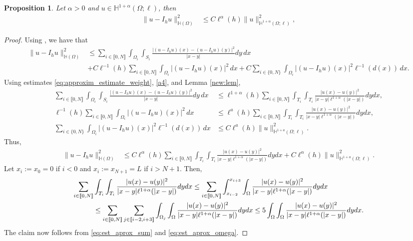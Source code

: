 \documentclass[11 pt]{article}
\newcommand\inter[1]{\llbracket #1\rrbracket}
\newtheorem{proposition}[theorem]{Proposition}
\numberwithin{equation}{section}
\newcommand{\weH}[1]{\mathbb H^{#1}(\Omega;\ell)}
\begin{document}
\begin{proposition}\label{prop:est_interpolator}
Let $\alpha>0$ and $u\in\weH{1+\alpha}$, then
\begin{align}\label{eq:interp_final}
    \|u-I_hu\|^2_{\mathbb H(\Omega)}&\leq C\ell^{\alpha}(h) \|u\|^2_{\mathbb H^{1+\alpha}(\Omega;\ell)},
\end{align}
\end{proposition}
\begin{proof}
Using , we have that
\begin{align*}
    \|u-I_h u\|^2_{\mathbb H(\Omega)}
    &\leq \sum_{i\in\inter{0,N}}\int_{\Omega_i}\int_{S_i}\frac{|(u-I_h u)(x)-(u-I_h u)(y)|^2}{|x-y|}dy\,dx\\
    &+C\ell^{-1}(h)\sum_{i\in\inter{0,N}}\int_{\Omega_i}|(u-I_h u)(x)|^2\,dx +C\sum_{i\in\{0,N\}}\int_{\Omega_i}|(u-I_h u)(x)|^2\ell^{-1}(d(x))\,dx.
\end{align*}
Using estimates \eqref{eq:approxim_estimate_weight}, \eqref{a4}, and Lemma \ref{new:lem},
\begin{align*}
 \sum_{i\in\inter{0,N}}\int_{\Omega_i}\int_{S_i}\frac{|(u-I_h u)(x)-(u-I_h u)(y)|^2}{|x-y|}dy\,dx &\leq
 \ell^{1+\alpha}(h)\sum_{i\in\inter{0,N}}\int_{T_i}\int_{T_i}\frac{|u(x)-u(y)|^2}{|x-y|\ell^{1+\alpha}(|x-y|)}dy dx,
 \\
\ell^{-1}(h)\sum_{i\in\inter{0,N}}\int_{\Omega_i}|(u-I_h u)(x)|^2\,dx &\leq \ell^{a}(h)\sum_{i\in\inter{0,N}}\int_{T_i}\int_{T_i}\frac{|u(x)-u(y)|^2}{|x-y|\ell^{1+\alpha}(|x-y|)}dy dx,\\
 \sum_{i\in\{0,N\}}\int_{\Omega_i}|(u-I_h u)(x)|^2\ell^{-1}(d(x))\,dx
 &\leq C \ell^a(h)\|u\|^2_{\mathbb H^{1+a}(\Omega;\ell)}.
\end{align*}
Thus,
%
\begin{align}
    \|u-I_h u\|^2_{\mathbb H(\Omega)}&\leq
    C \ell^{\alpha}(h)\sum_{i\in\inter{0,N}}\int_{T_i}\int_{T_i}\frac{|u(x)-u(y)|^2}{|x-y|\ell^{1+\alpha}(|x-y|)}dy dx+C\ell^{\alpha}(h)\|u\|^2_{\mathbb H^{1+a}(\Omega;\ell)}.\label{eq:est_aprox_sum}
\end{align}
Let $x_i:=x_0=0$ if $i<0$ and $x_i:=x_{N+1}=L$ if $i>N+1$.  Then,
%
\begin{align}\notag
   \sum_{i\in\inter{0,N}} &\int_{T_i}\int_{T_i}\frac{|u(x)-u(y)|^2}{|x-y|\ell^{1+\alpha}(|x-y|)}dy dx
   \leq \sum_{i\in\inter{0,N}} \int_{x_{i-2}}^{x_{i+3}}\int_{\Omega}\frac{|u(x)-u(y)|^2}{|x-y|\ell^{1+\alpha}(|x-y|)}dy dx\notag\\
   &\leq \sum_{i\in\inter{0,N}} \sum_{j\in \inter{i-2,i+3}}\int_{\Omega_j}\int_{\Omega}\frac{|u(x)-u(y)|^2}{|x-y|\ell^{1+\alpha}(|x-y|)}dy dx\leq 5\int_{\Omega}\int_{\Omega} \frac{|u(x)-u(y)|^2}{|x-y|\ell^{1+\alpha}(|x-y|)}dy dx. \label{eq:est_aprox_omega}
\end{align}
The claim now follows from \eqref{eq:est_aprox_sum} and \eqref{eq:est_aprox_omega}.
\end{proof}
%
\end{document}
